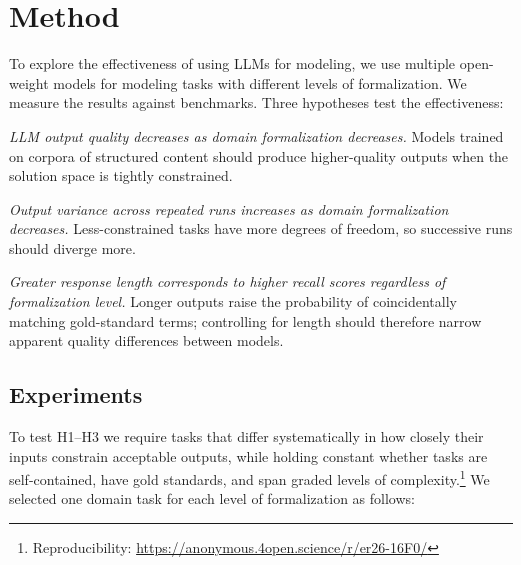 \documentclass[runningheads]{llncs}
\begin{document}
\section{Method}
\label{sec:method}

To explore the effectiveness of using LLMs for modeling, we use multiple open-weight models for modeling tasks with different levels of formalization. We measure the results against benchmarks. Three hypotheses test the effectiveness: 

\begin{description}[noitemsep,leftmargin=2em,style=nextline]
  \item[H1: Quality gradient]
  \textit{LLM output quality decreases as domain formalization decreases.} Models trained on corpora of structured content should produce higher-quality outputs when the solution space is tightly constrained.

  \item[H2: Variance gradient]
  \textit{Output variance across repeated runs increases as domain formalization decreases.} Less-constrained tasks have more degrees of freedom, so successive runs should diverge more.

  \item[H3: Length--quality mediation]
  \textit{Greater response length corresponds to higher recall scores regardless of formalization level.} Longer outputs raise the probability of coincidentally matching gold-standard terms; controlling for length should therefore narrow apparent quality differences between models.
\end{description}


\subsection{Experiments}

To test H1--H3 we require tasks that differ systematically in how closely their inputs constrain acceptable outputs, while holding constant whether tasks are self-contained, have gold standards, and span graded levels of complexity.\footnote{Reproducibility: \url{https://anonymous.4open.science/r/er26-16F0/}} We selected one domain task for each level of formalization as follows:
\end{document}
